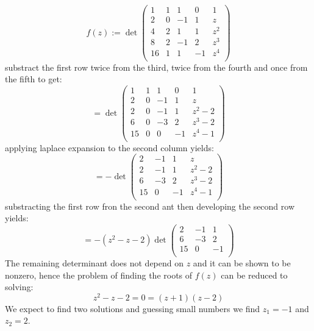 \documentclass[a4paper,10pt]{article}
\begin{document}
\subsection{}
\label{sub:three}
\begin{equation*}
	f(z):= \det \begin{pmatrix}
	1&1&1&0&1\\
	2&0&-1&1&z\\
	4&2&1&1&z^2\\
	8&2&-1&2&z^3\\
	16&1&1&-1&z^4\\
	\end{pmatrix}
\end{equation*}
substract the first row twice from the third, twice from the fourth and once from the fifth to get:
\begin{equation*}
	= \det\begin{pmatrix}
	1&1&1&0&1\\
	2&0&-1&1&z\\
	2&0&-1&1&z^2-2\\
	6&0&-3&2&z^3-2\\
	15&0&0&-1&z^4-1\\
	\end{pmatrix}
\end{equation*}
applying laplace expansion to the second column yields:
\begin{equation*}
	= -\det \begin{pmatrix}
	2&-1&1&z\\
	2&-1&1&z^2-2\\
	6&-3&2&z^3-2\\
	15&0&-1&z^4-1\\
	\end{pmatrix}
\end{equation*}
substracting the first row fron the second ant then developing the second row yields:
\begin{equation*}
	= -(z^2-z-2)\det \begin{pmatrix}
	2&-1&1\\
	6&-3&2\\
	15&0&-1\\
	\end{pmatrix}
\end{equation*}
The remaining determinant does not depend on $z$ and it can be shown to be nonzero, hence the problem of finding the roots of $f(z)$ can be reduced to solving:
\begin{equation*}
	z^2-z-2=0=(z+1)(z-2)
\end{equation*}
We expect to find two solutions and guessing small numbers we find $z_1=-1$ and $z_2=2$.
\end{document}
